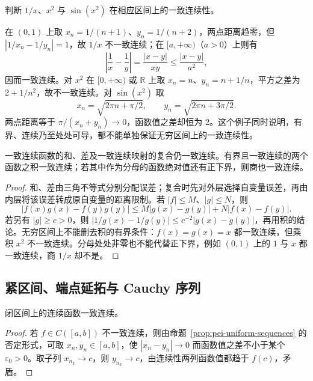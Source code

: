 \begin{example}
判断 $1/x$、$x^2$ 与 $\sin(x^2)$ 在相应区间上的一致连续性。
\end{example}

\begin{solve}
在 $(0,1)$ 上取 $x_n=1/(n+1)$、$y_n=1/(n+2)$，两点距离趋零，但 $|1/x_n-1/y_n|=1$，故 $1/x$ 不一致连续；在 $[a,+\infty)$（$a>0$）上则有
\[
\left|\frac1x-\frac1y\right|=\frac{|x-y|}{xy}\le\frac{|x-y|}{a^2},
\]
因而一致连续。对 $x^2$ 在 $[0,+\infty)$ 或 $\mathbb R$ 上取 $x_n=n$、$y_n=n+1/n$，平方之差为 $2+1/n^2$，故不一致连续。对 $\sin(x^2)$ 取
\[
x_n=\sqrt{2\pi n+\pi/2},\qquad y_n=\sqrt{2\pi n+3\pi/2}.
\]
两点距离等于 $\pi/(x_n+y_n)\to0$，函数值之差却恒为 $2$。这个例子同时说明，有界、连续乃至处处可导，都不能单独保证无穷区间上的一致连续性。
\end{solve}

\begin{proposition}
一致连续函数的和、差及一致连续映射的复合仍一致连续。有界且一致连续的两个函数之积一致连续；若其中作为分母的函数绝对值还有正下界，则商也一致连续。
\end{proposition}

\begin{proof}
和、差由三角不等式分别分配误差；复合时先对外层选择自变量误差，再由内层将该误差转成原自变量的距离限制。若 $|f|\le M$、$|g|\le N$，则
\[
|f(x)g(x)-f(y)g(y)|\le M|g(x)-g(y)|+N|f(x)-f(y)|.
\]
若另有 $|g|\ge c>0$，则 $|1/g(x)-1/g(y)|\le c^{-2}|g(x)-g(y)|$，再用积的结论。无穷区间上不能删去积的有界条件：$f(x)=g(x)=x$ 都一致连续，但乘积 $x^2$ 不一致连续。分母处处非零也不能代替正下界，例如 $(0,1)$ 上的 $1$ 与 $x$ 都一致连续，商 $1/x$ 却不是。
\end{proof}

\subsection{紧区间、端点延拓与 Cauchy 序列}

\begin{theorem}
\label{thm:pei-heine-cantor}
闭区间上的连续函数一致连续。
\end{theorem}

\begin{proof}
若 $f\in C([a,b])$ 不一致连续，则由命题~\ref{prop:pei-uniform-sequences} 的否定形式，可取 $x_n,y_n\in[a,b]$，使 $|x_n-y_n|\to0$ 而函数值之差不小于某个 $\varepsilon_0>0$。取子列 $x_{n_k}\to c$，则 $y_{n_k}\to c$，由连续性两列函数值都趋于 $f(c)$，矛盾。
\end{proof}


